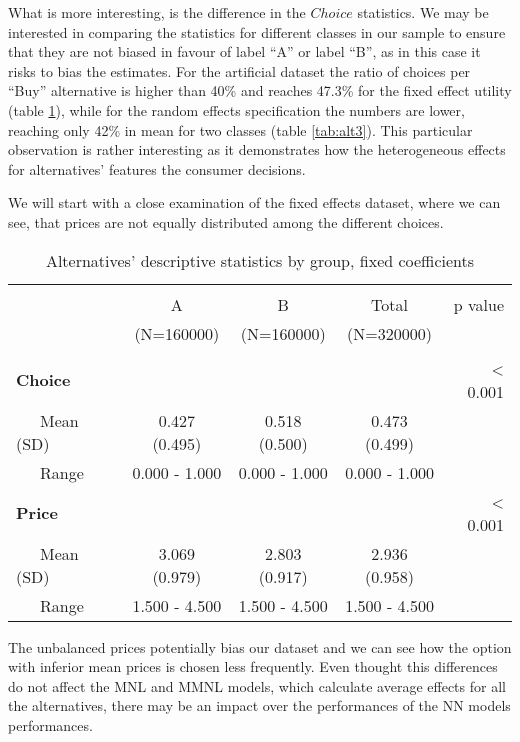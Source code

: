 \documentclass[11pt,]{article}
\begin{document}
What is more interesting, is the difference in the \(Choice\)
statistics. We may be interested in comparing the statistics for
different classes in our sample to ensure that they are not biased in
favour of label ``A'' or label ``B'', as in this case it risks to bias
the estimates. For the artificial dataset the ratio of choices per
``Buy'' alternative is higher than 40\% and reaches 47.3\% for the fixed
effect utility (table \ref{tab:alt2}), while for the random effects
specification the numbers are lower, reaching only 42\% in mean for two
classes (table \ref{tab:alt3}). This particular observation is rather
interesting as it demonstrates how the heterogeneous effects for
alternatives' features the consumer decisions.

We will start with a close examination of the fixed effects dataset,
where we can see, that prices are not equally distributed among the
different choices.

\begin{table}[!htbp] \centering 
  \caption{Alternatives' descriptive statistics by group, fixed coefficients} 
  \label{tab:alt2} 
\begin{tabular}{@{\extracolsep{5pt}}lcccr}
\\[-1.8ex]\hline 
\hline \\[-1.8ex] 
 & A  & B  & Total  & p value\\
 & (N=160000) & (N=160000) & (N=320000) &  \\
\hline \\[-1.8ex] 
\textbf{Choice} &  &  &  & < 0.001\\
~~~Mean (SD) & 0.427 (0.495) & 0.518 (0.500) & 0.473 (0.499) & \\
~~~Range & 0.000 - 1.000 & 0.000 - 1.000 & 0.000 - 1.000 & \\
\textbf{Price} &  &  &  & < 0.001\\
~~~Mean (SD) & 3.069 (0.979) & 2.803 (0.917) & 2.936 (0.958) & \\
~~~Range & 1.500 - 4.500 & 1.500 - 4.500 & 1.500 - 4.500 & \\
\hline
\end{tabular}
\end{table}

The unbalanced prices potentially bias our dataset and we can see how
the option with inferior mean prices is chosen less frequently. Even
thought this differences do not affect the MNL and MMNL models, which
calculate average effects for all the alternatives, there may be an
impact over the performances of the NN models performances.
\end{document}
